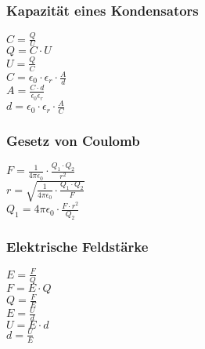 \subsubsection{Kapazität eines Kondensators} 
\begin{minipage}{0.45\textwidth} 
$ C = \frac{Q}{U} $\\ 
$ Q = C\cdot U $\\ 
$ U = \frac{Q}{C} $\\ 
$ C = \epsilon _{0} \cdot \epsilon _{r} \cdot \frac{A}{d} $\\ 
$ A = \frac{C\cdot d}{\epsilon _{0} \epsilon _{r} } $\\ 
$ d = \epsilon _{0} \cdot \epsilon _{r} \cdot \frac{A}{C} $\\ 
\end{minipage} 
\begin{minipage}{0.45\textwidth} 
 
\end{minipage} 
\subsubsection{Gesetz von Coulomb} 
\begin{minipage}{0.45\textwidth} 
$ F = \frac{ 1}{4\pi \epsilon _{0} } \cdot  \frac{Q_{1} \cdot Q_{2} }{  r^{2} } $\\ 
$ r = \sqrt{\frac{  1}{4\pi \epsilon _{0} } \cdot  \frac{Q_{1} \cdot Q_{2} }{  F}} $\\ 
$ Q_{1}  = 4\pi \epsilon _{0}  \cdot  \frac{F\cdot r^{2} }{ Q_{2} } $\\ 
\end{minipage} 
\begin{minipage}{0.45\textwidth} 
 
\end{minipage} 
\subsubsection{Elektrische Feldstärke} 
\begin{minipage}{0.45\textwidth} 
$ E = \frac{F}{Q} $\\ 
$ F = E\cdot Q $\\ 
$ Q = \frac{F}{E} $\\ 
$ E = \frac{U}{d} $\\ 
$ U = E\cdot d $\\ 
$ d = \frac{U}{E} $\\ 
\end{minipage} 
\begin{minipage}{0.45\textwidth} 
 
\end{minipage} 
